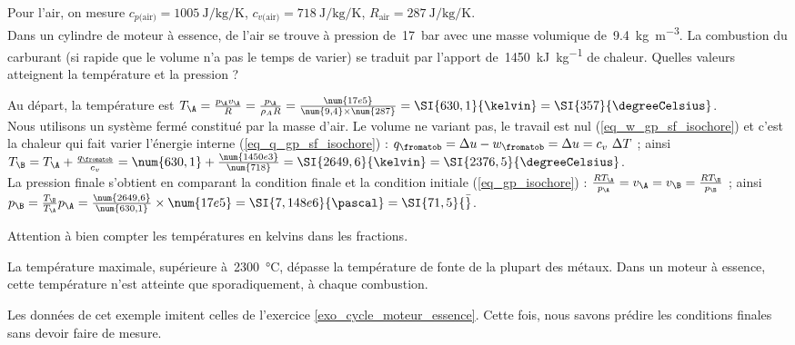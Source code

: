 		\begin{anexample}
			Pour l’air, on mesure $c_{p\text{(air)}} = \SI{1005}{\joule\per\kilogram\per\kelvin}$, $c_{v\text{(air)}} = \SI{718}{\joule\per\kilogram\per\kelvin}$, $R_\text{air} = \SI{287}{\joule\per\kilogram\per\kelvin}$.\\
			Dans un cylindre de moteur à essence, de l’air se trouve à pression de~\SI{17}{\bar} avec une masse volumique de~\SI{9,4}{\kilogram\per\metre\cubed}. La combustion du carburant (si rapide que le volume n’a pas le temps de varier) se traduit par l’apport de~\SI{1450}{\kilo\joule\per\kilogram} de chaleur. Quelles valeurs atteignent la température et la pression ?
				\begin{answer}
					Au départ, la température est $T_\A = \frac{p_\A v_\A}{R} = \frac{p_\A}{\rho_A R} = \frac{\num{17e5}}{\num{9,4} \times \num{287}} = \SI{630,1}{\kelvin} = \SI{357}{\degreeCelsius}$.\\
					Nous utilisons un système fermé constitué par la masse d’air. Le volume ne variant pas, le travail est nul (\ref{eq_w_gp_sf_isochore}) et c’est la chaleur qui fait varier l’énergie interne (\ref{eq_q_gp_sf_isochore}) : $q_\fromatob = \Delta u - w_\fromatob = \Delta u = c_v \ \Delta T$ ; ainsi $T_\B = T_\A + \frac{q_\fromatob}{c_v} = \num{630,1} + \frac{\num{1450e3}}{\num{718}} = \SI{2649,6}{\kelvin} = \SI{2376,5}{\degreeCelsius}$.\\
					La pression finale s’obtient en comparant la condition finale et la condition initiale (\ref{eq_gp_isochore}) : $\frac{R T_\A}{p_\A} = v_\A = v_\B = \frac{R T_\B}{p_\B} $ ; ainsi $p_\B = \frac{T_\B}{T_\A} p_\A = \frac{\num{2649,6}}{\num{630,1}} \times \num{17e5} = \SI{7,148e6}{\pascal} = \SI{71,5}{\bar}$.
						\begin{remark}Attention à bien compter les températures en \si{kelvins} dans les fractions.\end{remark}
						\begin{remark}La température maximale, supérieure à~\SI{2300}{\degreeCelsius}, dépasse la température de fonte de la plupart des métaux. Dans un moteur à essence, cette température n’est atteinte que sporadiquement, à chaque combustion.\end{remark}
						\begin{remark}Les données de cet exemple imitent celles de l’exercice \ref{exo_cycle_moteur_essence}. Cette fois, nous savons prédire les conditions finales sans devoir faire de mesure.\end{remark}
				\end{answer}
		\end{anexample}

